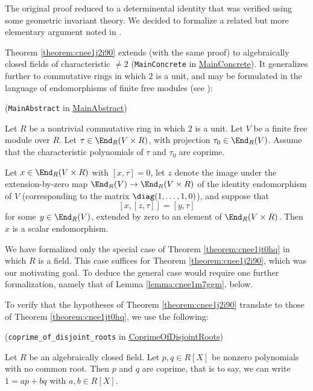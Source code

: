 \documentclass[reqno]{amsart} 
\begin{document}
\begin{remark}
  The original proof reduced to a determinental identity \cite[Theorem 17.2]{2020arXiv201202187N} that was verified using some geometric invariant theory.  We decided to formalize a related but more elementary argument noted in \cite[Remark 5.15]{2023arXiv2309.06314}.
\end{remark}

Theorem \ref{theorem:cnee1j2i90} extends (with the same proof) to algebraically closed fields of characteristic $\neq 2$ (\verb|MainConcrete| in \href{MainConcrete.lean}{MainConcrete}).  It generalizes further to commutative rings in which $2$ is a unit, and may be formulated in the language of endomorphisms of finite free modules (see \cite[Remark 5.15]{2023arXiv2309.06314}):

\begin{theorem}\label{theorem:cnee1jt0hq}
  (\verb|MainAbstract| in \href{MainAbstract.lean}{MainAbstract})
  
  Let $R$ be a nontrivial commutative ring in which $2$ is a unit.  Let $V$ be a finite free module over $R$.  Let $\tau \in \End_R(V \times R)$, with projection $\tau_0 \in \End_R(V)$.  Assume that the characteristic polynomials of $\tau$ and $\tau_0$ are coprime.

  Let $x \in \End_R(V \times R)$ with $[x,\tau] = 0$, let $z$ denote the image under the extension-by-zero map $\End_R(V) \rightarrow \End_R(V \times R)$ of the identity endomorphism of $V$ (corresponding to the matrix $\diag(1,\dotsc,1,0)$), and suppose that
  \[
    [x,[z,\tau]] = [y, \tau]
  \]
  for some $y \in \End_R(V)$, extended by zero to an element of $\End_R(V \times R)$.  Then $x$ is a scalar endomorphism.
\end{theorem}
\begin{remark}\label{remark:cnee1noh9i}
  We have formalized only the special case of Theorem \ref{theorem:cnee1jt0hq} in which $R$ is a field.  This case suffices for Theorem \ref{theorem:cnee1j2i90}, which was our motivating goal.  To deduce the general case would require one further formalization, namely that of Lemma \ref{lemma:cnee1m7ggm}, below.
\end{remark}

To verify that the hypotheses of Theorem \ref{theorem:cnee1j2i90} translate to those of Theorem \ref{theorem:cnee1jt0hq}, we use the following:
\begin{lemma}\label{lemma:cnee1nts0y}
  (\verb|coprime_of_disjoint_roots| in \href{CoprimeOfDisjointRoots.lean}{CoprimeOfDisjointRoots})

  Let $R$ be an algebraically closed field.  Let $p, q \in R[X]$ be nonzero polynomials with no common root.  Then $p$ and $q$ are coprime, that is to say, we can write $1 = a p + b q$ with $a,b \in R[X]$.
\end{lemma}
\end{document}
